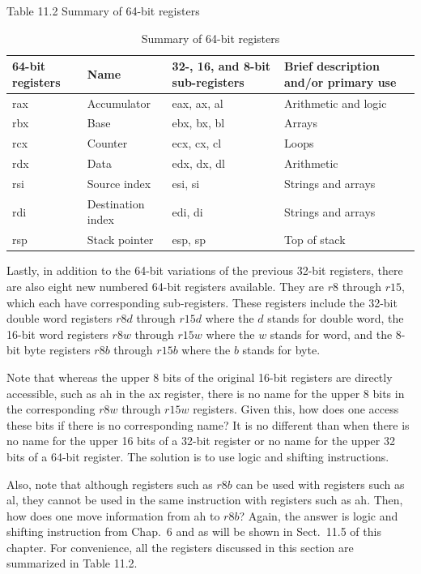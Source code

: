 \documentclass[10pt]{book}
\begin{document}
Table 11.2 Summary of 64-bit registers
\begin{table}[h]
\centering
\caption{Summary of 64-bit registers}
\begin{tabular}{|l|l|l|l|}
\hline
64-bit registers & Name & 32-, 16, and 8-bit sub-registers & Brief description and/or primary use \\
\hline
rax & Accumulator & eax, ax, al & Arithmetic and logic \\
\hline
rbx & Base & ebx, bx, bl & Arrays \\
\hline
rcx & Counter & ecx, cx, cl & Loops \\
\hline
rdx & Data & edx, dx, dl & Arithmetic \\
\hline
rsi & Source index & esi, si & Strings and arrays \\
\hline
rdi & Destination index & edi, di & Strings and arrays \\
\hline
rsp & Stack pointer & esp, sp & Top of stack \\
\hline
\end{tabular}
\end{table}

Lastly, in addition to the 64-bit variations of the previous 32-bit registers, there are also eight new numbered 64-bit registers available. They are $r8$ through $r15$, which each have corresponding sub-registers. These registers include the 32-bit double word registers $r8d$ through $r15d$ where the $d$ stands for double word, the 16-bit word registers $r8w$ through $r15w$ where the $w$ stands for word, and the 8-bit byte registers $r8b$ through $r15b$ where the $b$ stands for byte.

Note that whereas the upper 8 bits of the original 16-bit registers are directly accessible, such as ah in the ax register, there is no name for the upper 8 bits in the corresponding $r8w$ through $r15w$ registers. Given this, how does one access these bits if there is no corresponding name? It is no different than when there is no name for the upper 16 bits of a 32-bit register or no name for the upper 32 bits of a 64-bit register. The solution is to use logic and shifting instructions.

Also, note that although registers such as $r8b$ can be used with registers such as al, they cannot be used in the same instruction with registers such as ah. Then, how does one move information from ah to $r8b$? Again, the answer is logic and shifting instruction from Chap.\ 6 and as will be shown in Sect.\ 11.5 of this chapter. For convenience, all the registers discussed in this section are summarized in Table 11.2.
\end{document}
